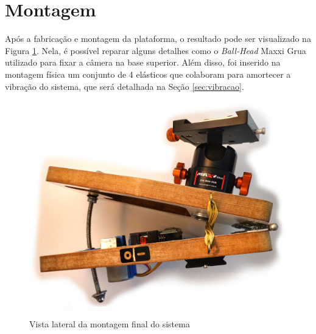 \section{Montagem}

Após a fabricação e montagem da plataforma, o resultado pode ser visualizado na Figura \ref{fig:montagemReal}. Nela, é possível reparar alguns detalhes como o \textit{Ball-Head} Maxxi Grua utilizado para fixar a câmera na base superior. Além disso, foi inserido na montagem física um conjunto de 4 elásticos que colaboram para amortecer a vibração do sistema, que será detalhada na Seção \ref{sec:vibracao}.




\begin{figure}[!htb]
	\centering
	\caption{Vista lateral da montagem final do sistema}
	\includegraphics[width=.8\linewidth]{figuras/desPlataforma/montagemReal}
	\label{fig:montagemReal}
\end{figure}

